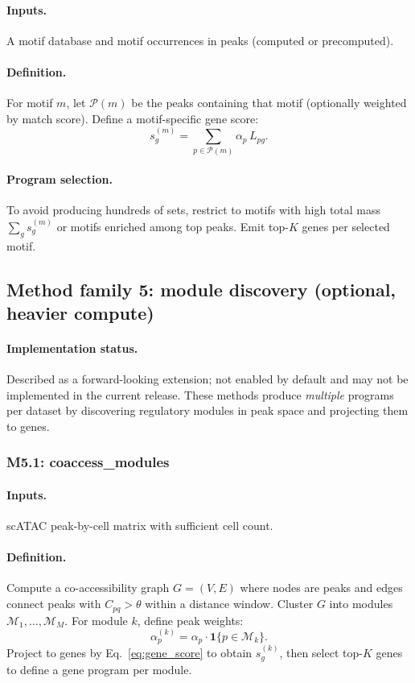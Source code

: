 \documentclass[11pt]{article}
\begin{document}
\paragraph{Inputs.} A motif database and motif occurrences in peaks (computed or precomputed).
\paragraph{Definition.} For motif $m$, let $\mathcal{P}(m)$ be the peaks containing that motif (optionally weighted by match score).
Define a motif-specific gene score:
\begin{equation}
s_{g}^{(m)} = \sum_{p \in \mathcal{P}(m)} \alpha_p \, L_{pg}.
\label{eq:motif_regulon}
\end{equation}
\paragraph{Program selection.} To avoid producing hundreds of sets, restrict to motifs with high total mass $\sum_g s_g^{(m)}$ or motifs enriched among top peaks. Emit top-$K$ genes per selected motif.

\subsection{Method family 5: module discovery (optional, heavier compute)}
\paragraph{Implementation status.} Described as a forward-looking extension; not enabled by default and may not be implemented in the current release.
These methods produce \emph{multiple} programs per dataset by discovering regulatory modules in peak space and projecting them to genes.

\subsubsection{M5.1: coaccess\_modules}
\paragraph{Inputs.} scATAC peak-by-cell matrix with sufficient cell count.
\paragraph{Definition.} Compute a co-accessibility graph $G=(V,E)$ where nodes are peaks and edges connect peaks with $C_{pq}>\theta$ within a distance window.
Cluster $G$ into modules $\mathcal{M}_1,\dots,\mathcal{M}_M$.
For module $k$, define peak weights:
\[
\alpha_p^{(k)} = \alpha_p \cdot \mathbf{1}\{p \in \mathcal{M}_k\}.
\]
Project to genes by Eq.\ \ref{eq:gene_score} to obtain $s_g^{(k)}$, then select top-$K$ genes to define a gene program per module.
\end{document}
